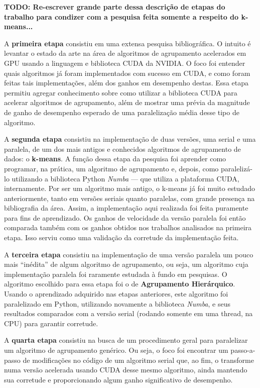 \documentclass[12pt,
openright, 
oneside, %
a4paper,    %
brazil]{facom-ufu-abntex2}
\begin{document}
\textbf{TODO: Re-escrever grande parte dessa descrição de etapas do trabalho para condizer com a pesquisa feita somente a respeito do k-means...}


A \textbf{primeira etapa} consistiu em uma extensa pesquisa bibliográfica. O intuito é levantar o estado da arte na área de algoritmos de agrupamento acelerados em GPU usando a linguagem e biblioteca CUDA da NVIDIA. O foco foi entender quais algoritmos já foram implementados com sucesso em CUDA, e como foram feitas tais implementações, além dos ganhos em desempenho destas. Essa etapa permitiu agregar conhecimento sobre como utilizar a biblioteca CUDA para acelerar algoritmos de agrupamento, além de mostrar uma prévia da magnitude de ganho de desempenho esperado de uma paralelização média desse tipo de algoritmo.

A \textbf{segunda etapa} consistiu na implementação de duas versões, uma serial e uma paralela, de um dos mais antigos e conhecidos algoritmos de agrupamento de dados: o \textbf{k-means}. A função dessa etapa da pesquisa foi aprender como programar, na prática, um algoritmo de agrupamento e, depois, como paralelizá-lo utilizando a biblioteca Python \textit{Numba} --- que utiliza a plataforma CUDA, internamente. Por ser um algoritmo mais antigo, o k-means já foi muito estudado anteriormente, tanto em versões seriais quanto paralelas, com grande presença na bibliografia da área. Assim, a implementação aqui realizada foi feita puramente para fins de aprendizado. Os ganhos de velocidade da versão paralela foi então comparada também com os ganhos obtidos nos trabalhos analisados na primeira etapa. Isso serviu como uma validação da corretude da implementação feita.

A \textbf{terceira etapa} consistiu na implementação de uma versão paralela um pouco mais \enquote{inédita} de algum algoritmo de agrupamento, ou seja, um algoritmo cuja implementação paralela foi raramente estudada à fundo em pesquisas. O algoritmo escolhido para essa etapa foi o de \textbf{Agrupamento Hierárquico}. Usando o aprendizado adquirido nas etapas anteriores, este algoritmo foi paralelizado em Python, utilizando novamente a biblioteca \textit{Numba}, e seus resultados comparados com a versão serial (rodando somente em uma thread, na CPU) para garantir corretude.

A \textbf{quarta etapa} consistiu na busca de um procedimento geral para paralelizar um algoritmo de agrupamento genérico. Ou seja, o foco foi encontrar um passo-a-passo de modificações no código de um algoritmo serial que, ao fim, o transforme numa versão acelerada usando CUDA desse mesmo algoritmo, ainda mantendo sua corretude e proporcionando algum ganho significativo de desempenho.
\end{document}
